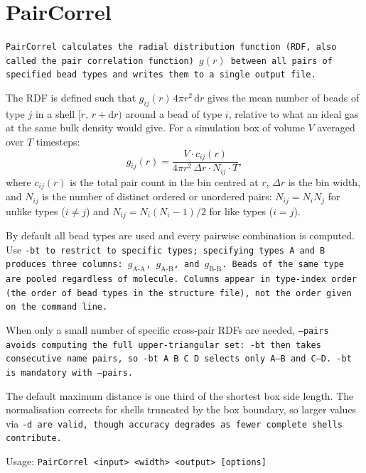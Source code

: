 \section{PairCorrel} \label{sec:PairCorrel}

\tt{PairCorrel} calculates the radial distribution function (RDF, also called
the pair correlation function) $g(r)$ between all pairs of specified bead types
and writes them to a single output file.

The RDF is defined such that $g_{ij}(r)\,4\pi r^2\,\mathrm{d}r$ gives the
mean number of beads of type $j$ in a shell $[r,\, r+\mathrm{d}r)$ around a
bead of type $i$, relative to what an ideal gas at the same bulk density would
give. For a simulation box of volume $V$ averaged over $T$ timesteps:
\begin{equation}
  g_{ij}(r) = \frac{V \cdot c_{ij}(r)}{4\pi r^2\,\Delta r \cdot N_{ij} \cdot T},
\end{equation}
where $c_{ij}(r)$ is the total pair count in the bin centred at $r$, $\Delta r$
is the bin width, and $N_{ij}$ is the number of distinct ordered or unordered
pairs: $N_{ij} = N_i N_j$ for unlike types ($i \neq j$) and $N_{ij} =
N_i(N_i-1)/2$ for like types ($i = j$).

By default all bead types are used and every pairwise combination is computed.
Use \tt{-bt} to restrict to specific types; specifying types A and B produces
three columns: $g_\text{A-A}$, $g_\text{A-B}$, and $g_\text{B-B}$. Beads of
the same type are pooled regardless of molecule. Columns appear in
type-index order (the order of bead types in the structure file), not the order
given on the command line.

When only a small number of specific cross-pair RDFs are needed, \tt{--pairs}
avoids computing the full upper-triangular set: \tt{-bt} then takes consecutive
name pairs, so \tt{-bt A B C D} selects only A--B and C--D. \tt{-bt} is
mandatory with \tt{--pairs}.

The default maximum distance is one third of the shortest box side length.
The normalisation corrects for shells truncated by the box boundary, so larger
values via \tt{-d} are valid, though accuracy degrades as fewer complete shells
contribute.

\vspace{1em}
\noindent
Usage: \tt{PairCorrel <input> <width> <output> [options]}

